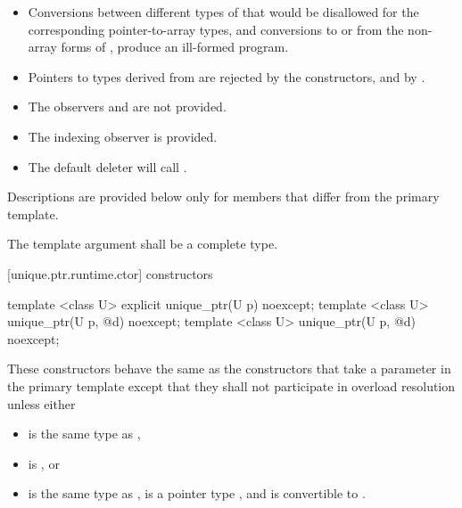 \begin{itemize}
\item Conversions between different types of
that would be disallowed for the corresponding pointer-to-array types,
and conversions to or from the non-array forms of
, produce an ill-formed program.

\item Pointers to types derived from  are
rejected by the constructors, and by .

\item The observers  and
 are not provided.

\item The indexing observer  is provided.

\item The default deleter will call .
\end{itemize}

\pnum
Descriptions are provided below only for members that
differ from the primary template.

\pnum
The template argument  shall be a complete type.

[unique.ptr.runtime.ctor]{ constructors}

%
\begin{itemdecl}
template <class U> explicit unique_ptr(U p) noexcept;
template <class U> unique_ptr(U p, @\seebelow@ d) noexcept;
template <class U> unique_ptr(U p, @\seebelow@ d) noexcept;
\end{itemdecl}

\begin{itemdescr}
\pnum
These constructors behave the same as
the constructors that take a  parameter
in the primary template
except that they
shall not participate in overload resolution unless either

\begin{itemize}
\item {} is the same type as ,
\item {} is , or
\item {} is the same type as ,
       is a pointer type , and
       is convertible to .
\end{itemize}
\end{itemdescr}

